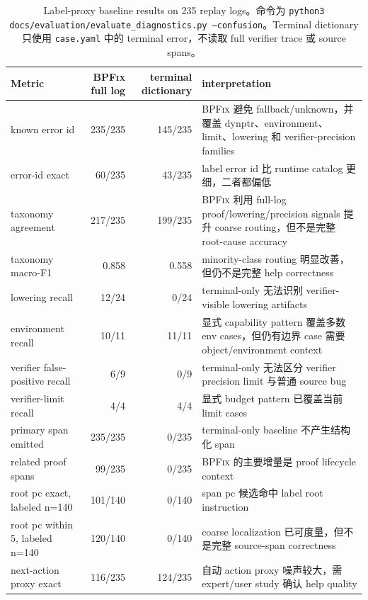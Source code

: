 \documentclass[letterpaper,twocolumn,10pt]{article}
\newcommand{\sys}{\textsc{BPFix}\xspace}
\newcommand{\code}[1]{\texttt{#1}}
\begin{document}
\begin{table}[t]
\centering
\small
\caption{Label-proxy baseline results on 235 replay logs。命令为 \code{python3 docs/evaluation/evaluate\_diagnostics.py --confusion}。Terminal dictionary 只使用 \code{case.yaml} 中的 terminal error，不读取 full verifier trace 或 source spans。}
\label{tab:proxy-baseline}
\begin{tabularx}{\textwidth}{@{}l r r X@{}}
\toprule
Metric & \sys full log & terminal dictionary & interpretation \\
\midrule
known error id & 235/235 & 145/235 & \sys 避免 fallback/unknown，并覆盖 dynptr、environment、limit、lowering 和 verifier-precision families \\
error-id exact & 60/235 & 43/235 & label error id 比 runtime catalog 更细，二者都偏低 \\
taxonomy agreement & 217/235 & 199/235 & \sys 利用 full-log proof/lowering/precision signals 提升 coarse routing，但不是完整 root-cause accuracy \\
taxonomy macro-F1 & 0.858 & 0.558 & minority-class routing 明显改善，但仍不是完整 help correctness \\
lowering recall & 12/24 & 0/24 & terminal-only 无法识别 verifier-visible lowering artifacts \\
environment recall & 10/11 & 11/11 & 显式 capability pattern 覆盖多数 env cases，但仍有边界 case 需要 object/environment context \\
verifier false-positive recall & 6/9 & 0/9 & terminal-only 无法区分 verifier precision limit 与普通 source bug \\
verifier-limit recall & 4/4 & 4/4 & 显式 budget pattern 已覆盖当前 limit cases \\
primary span emitted & 235/235 & 0/235 & terminal-only baseline 不产生结构化 span \\
related proof spans & 99/235 & 0/235 & \sys 的主要增量是 proof lifecycle context \\
root pc exact, labeled n=140 & 101/140 & 0/140 & span pc 候选命中 label root instruction \\
root pc within 5, labeled n=140 & 120/140 & 0/140 & coarse localization 已可度量，但不是完整 source-span correctness \\
next-action proxy exact & 116/235 & 124/235 & 自动 action proxy 噪声较大，需 expert/user study 确认 help quality \\
\bottomrule
\end{tabularx}
\end{table}
\end{document}
